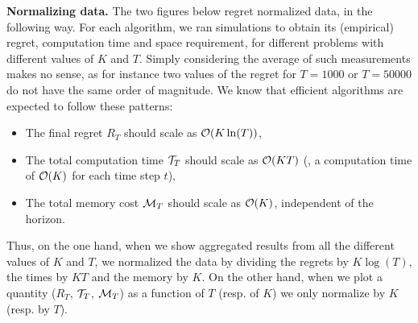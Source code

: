 \textbf{Normalizing data.}
%
The two figures below regret normalized data, in the following way.
For each algorithm, we ran simulations to obtain its (empirical) regret, computation time and space requirement, for different problems with different values of $K$ and $T$.
Simply considering the average of such measurements makes no sense, as for instance two values of the regret for $T=1000$ or $T=50000$ do not have the same order of magnitude.
%
We know that efficient algorithms are expected to follow these patterns:
\begin{itemize}%
    \item The final regret $R_T$ should scale as $\mathcal{O}(K \ln(T))$,
    \item The total computation time $\mathcal{T}_T$ should scale as $\mathcal{O}(K T)$ (\ie, a computation time of $\mathcal{O}(K)$ for each time step $t$),
    \item The total memory cost $\mathcal{M}_T$ should scale as $\mathcal{O}(K)$, independent of the horizon.
\end{itemize}
Thus, on the one hand, when we show aggregated results from all the different values of $K$ and $T$, we normalized the data by dividing the regrets by $K \log(T)$, the times by $K T$ and the memory by $K$.
%
On the other hand, when we plot a quantity ($R_T$, $\mathcal{T}_T$, $\mathcal{M}_T$) as a function of $T$ (resp. of $K$) we only normalize by $K$ (resp. by $T$).





